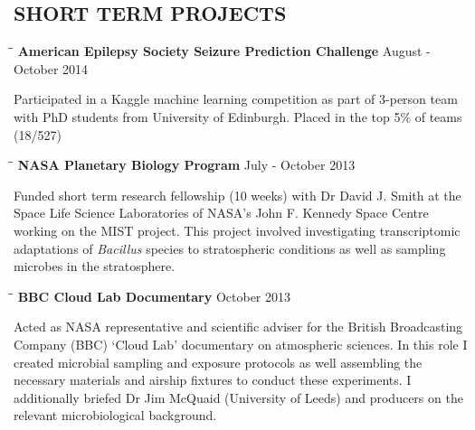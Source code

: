 \documentclass{res}
\begin{document}
\begin{resume}
\section{SHORT TERM PROJECTS}

   \vspace{-0.05in} 

   \begin{tabbing}
   \hspace{2in}\= \hspace{2.6in}\= \kill 
   {\bf American Epilepsy Society Seizure Prediction Challenge} \> \>        August - October 2014\\
     \end{tabbing}\vspace{-20pt}      
     Participated in a Kaggle machine learning competition as part of 3-person team with PhD students from University of Edinburgh. 
     Placed in the top 5\% of teams (18/527)

   \vspace{-0.1in} 
   \begin{tabbing}
   \hspace{2in}\= \hspace{2.6in}\= \kill 
    {\bf NASA Planetary Biology Program} \> \>        July - October 2013\\
     \end{tabbing}\vspace{-20pt}      
     Funded short term research fellowship (10 weeks) with Dr David J. Smith at the Space Life Science Laboratories of NASA's John F. Kennedy Space Centre working on the MIST project. This project involved investigating transcriptomic adaptations of \textit{Bacillus} species to stratospheric conditions as well as sampling microbes in the stratosphere.

     \vspace{-0.1in}
   \begin{tabbing}
   \hspace{2in}\= \hspace{2.6in}\= \kill 
    {\bf BBC Cloud Lab Documentary} \> \>        October 2013\\
     \end{tabbing}\vspace{-20pt}      
     Acted as NASA representative and scientific adviser for the British Broadcasting Company (BBC) `Cloud Lab' documentary on atmospheric sciences. In this role I created microbial sampling and exposure protocols as well assembling the necessary materials and airship fixtures to conduct these experiments. I additionally briefed Dr Jim McQuaid (University of Leeds) and producers on the relevant microbiological background. 


\end{resume}
\end{document}
